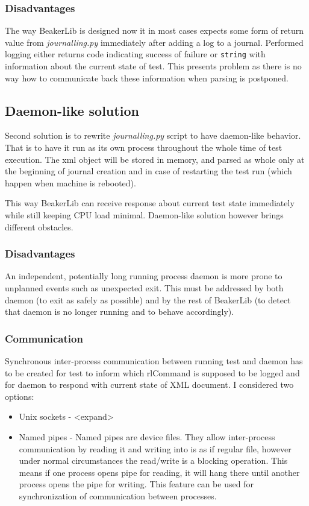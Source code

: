 \subsubsection{Disadvantages}
The way BeakerLib is designed now it in most cases expects some form of return value from \textit{journalling.py} immediately after adding a log to a journal. Performed logging either returns code indicating success of failure or \texttt{string} with information about the current state of test. This presents problem as there is no way how to communicate back these information when parsing is postponed. 

\subsection{Daemon-like solution}
Second solution is to rewrite \textit{journalling.py} script to have daemon-like behavior. That is to have it run as its own process throughout the whole time of test execution. The xml object will be stored in memory, and parsed as whole only at the beginning of journal creation and in case of restarting the test run (which happen when machine is rebooted).  

This way BeakerLib can receive response about current test state immediately while still keeping CPU load minimal. Daemon-like solution however brings different obstacles.

\subsubsection{Disadvantages}
An independent, potentially long running process daemon is more prone to unplanned events such as unexpected exit. This must be addressed by both daemon (to exit as safely as possible)  and by the rest of BeakerLib (to detect that daemon is no longer running and to behave accordingly). 

\subsubsection{Communication}
 Synchronous inter-process communication between running test and daemon has to be created for test to  inform which rlCommand is supposed to be logged and for daemon to respond with current state of XML document. I considered two options:

\begin{itemize}
\item Unix sockets  -  <expand>
\item Named pipes - Named pipes are device files. They allow inter-process communication by reading it and writing into is as if regular file, however under normal circumstances the read/write is a blocking operation. This means if one process opens pipe for reading, it will hang there until another process opens the pipe for writing. This feature can be used for synchronization of communication between processes. 
\end{itemize}

